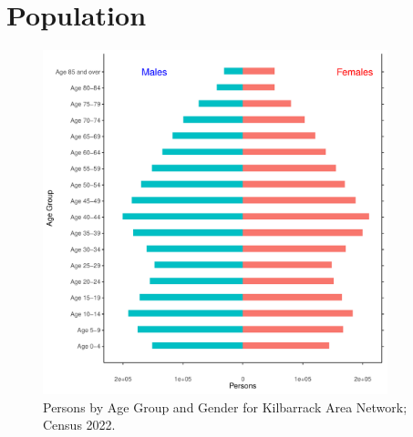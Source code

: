 \documentclass{article}
\begin{document}
\pagebreak

\section{Population} 
\label{sect:Pop}

\begin{figure}[h]
	\centering
	\includegraphics[width = 100mm]{../figures/PyramidPlot.pdf}
	\caption{Persons by Age Group and Gender for Kilbarrack Area Network; Census 2022.}
	\label{fig:2ae19629-1a6a-13a3-e055-000000000001}
	\end{figure}
\end{document}
